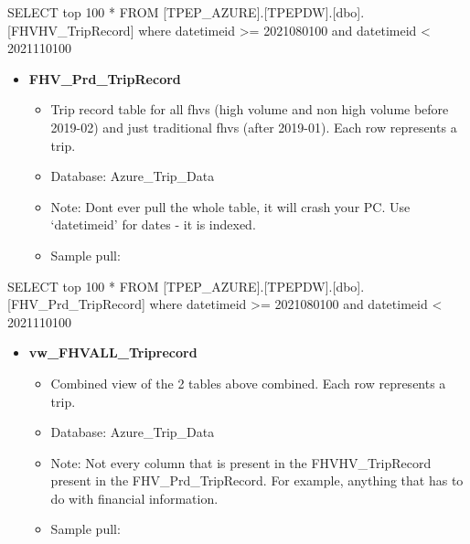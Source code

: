 \documentclass[
]{book}
\newenvironment{Shaded}{\begin{snugshade}}{\end{snugshade}}
\newcommand{\DecValTok}[1]{\textcolor[rgb]{0.00,0.00,0.81}{#1}}
\newcommand{\NormalTok}[1]{#1}
\newcommand{\SpecialCharTok}[1]{\textcolor[rgb]{0.00,0.00,0.00}{#1}}
\providecommand{\tightlist}{%
  \setlength{\itemsep}{0pt}\setlength{\parskip}{0pt}}
\begin{document}
\begin{Shaded}
\begin{Highlighting}[]
\NormalTok{SELECT top }\DecValTok{100} \SpecialCharTok{*}
\NormalTok{  FROM [TPEP\_AZURE].[TPEPDW].[dbo].[FHVHV\_TripRecord]}
\NormalTok{  where datetimeid }\SpecialCharTok{\textgreater{}=} \DecValTok{2021080100}\NormalTok{ and datetimeid }\SpecialCharTok{\textless{}} \DecValTok{2021110100}
\end{Highlighting}
\end{Shaded}

\begin{itemize}
\tightlist
\item
  \textbf{FHV\_Prd\_TripRecord}

  \begin{itemize}
  \tightlist
  \item
    Trip record table for all fhvs (high volume and non high volume before 2019-02) and just traditional fhvs (after 2019-01). Each row represents a trip.
  \item
    Database: Azure\_Trip\_Data
  \item
    Note: Dont ever pull the whole table, it will crash your PC. Use `datetimeid' for dates - it is indexed.\\
  \item
    Sample pull:
  \end{itemize}
\end{itemize}

\begin{Shaded}
\begin{Highlighting}[]
\NormalTok{SELECT top }\DecValTok{100} \SpecialCharTok{*}
\NormalTok{  FROM [TPEP\_AZURE].[TPEPDW].[dbo].[FHV\_Prd\_TripRecord]}
\NormalTok{  where datetimeid }\SpecialCharTok{\textgreater{}=} \DecValTok{2021080100}\NormalTok{ and datetimeid }\SpecialCharTok{\textless{}} \DecValTok{2021110100}
\end{Highlighting}
\end{Shaded}

\begin{itemize}
\tightlist
\item
  \textbf{vw\_FHVALL\_Triprecord}

  \begin{itemize}
  \tightlist
  \item
    Combined view of the 2 tables above combined. Each row represents a trip.
  \item
    Database: Azure\_Trip\_Data
  \item
    Note: Not every column that is present in the FHVHV\_TripRecord present in the FHV\_Prd\_TripRecord. For example, anything that has to do with financial information.
  \item
    Sample pull:
  \end{itemize}
\end{itemize}
\end{document}
